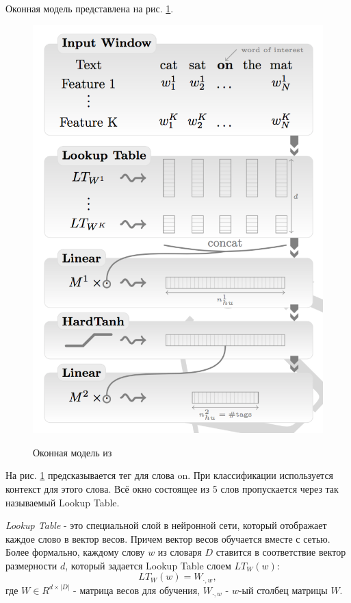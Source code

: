   Оконная модель представлена на рис. \ref{figure:window_net}.
  \begin{figure}[h]
    \centering
    \caption{Оконная модель из \citep{collobert2011natural}}
    \includegraphics{figures/window.png}
    \label{figure:window_net}
  \end{figure}

  На рис. \ref{figure:window_net} предсказывается тег для слова on.
  При классификации используется контекст для этого слова.
  Всё окно состоящее из 5 слов пропускается через так называемый Lookup Table.

  \textit{Lookup Table} - это специальной слой в нейронной сети, который
  отображает каждое слово в вектор весов. Причем вектор весов обучается вместе с сетью.
  Более формально, каждому слову $w$ из словаря $D$ ставится в соответствие
  вектор размерности $d$, который задается Lookup Table слоем $LT_W(w)$:
  \[
    LT_W(w) = W_{\cdot,w},
  \]
  где $W \in R^{d\times|D|}$ - матрица весов для обучения, $W_{\cdot,w}$ - $w$-ый столбец
  матрицы $W$.

